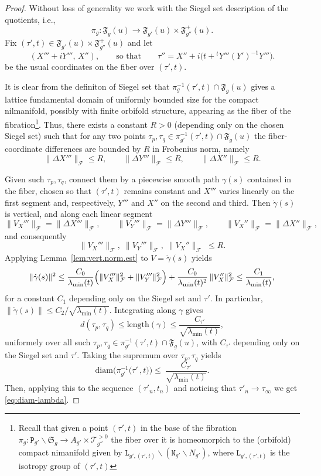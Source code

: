 \documentclass[10pt,a4paper]{amsart}
\newcommand{\cT}[1]{\mathscr{T}_{#1}^{\scriptscriptstyle{>0}}}
\newcommand{\diam}{\mathrm{diam}}
\newcommand{\fF}{\mathfrak{F}}
\newcommand{\fS}{\mathfrak{S}}
\newcommand{\tL}{\mathtt{L}}
\newcommand{\tN}{\mathtt{N}}
\newcommand{\tP}{\mathtt{P}}
\begin{document}
\begin{proof}
Without loss of generality we work with the Siegel set description of the quotients, i.e.,
\[
    \pi_{g}:\fF_g(u)\longrightarrow\fF_{g'}(u)\times\fF^{+}_{g''}(u).
\]
Fix $(\tau',t)\in \fF_{g'}(u)\times\fF^{+}_{g''}(u)$ and let 
\[
    (X'''+iY''',\,X''),
    \qquad\text{so that}\qquad
    \tau''=X'' + i\bigl(t+{}^tY'''(Y')^{-1}Y'''\bigr).
\]
be the usual coordinates on the fiber over $(\tau',t)$. 

It is clear from the definiton of Siegel set that $\pi^{-1}_{g}(\tau',t)\cap \fF_g(u)$  gives a lattice fundamental domain of uniformly bounded size for the compact nilmanifold, possibly with finite orbifold structure, appearing as the fiber of the fibration\footnote{Recall that given a point $(\tau',t)$ in the base of the fibration $\pi_g: \tP_{g'}\backslash \fS_g\to A_{g'}\times\cT{g''}$ the fiber over it is homeomorpich to the (orbifold) compact nimanifold given by $\tL_{g',(\tau',t)}\backslash(\tN_{g'}\backslash N_{g'})$, where $\tL_{g',(\tau',t)}$ is the isotropy group of $(\tau',t)$}. Thus, there exists a constant $R>0$ (depending only on the chosen Siegel set) such that for any two points $\tau_p,\tau_q\in \pi_{g'}^{-1}(\tau',t)\cap\fF_g(u)$ the fiber-coordinate differences are bounded by $R$ in Frobenius norm, namely
\begin{equation}\label{eq:bounded-increments}
\|\Delta X'''\|_{\mathcal {F}}\le R,\qquad
\|\Delta Y'''\|_{\mathcal {F}}\le R,\qquad
\|\Delta X''\|_{\mathcal {F}}\le R.
\end{equation}

Given such $\tau_p,\tau_q$, connect them by a piecewise smooth path $\gamma(s)$ contained in the fiber, chosen so that $(\tau',t)$ remains constant and $X'''$ varies linearly on the first segment and, respectively, $Y'''$ and $X''$ on the second and third. Then $\dot\gamma(s)$ is vertical, and along each linear segment
\[
\|V_X'''\|_{\mathcal{F}}=\|\Delta X'''\|_{\mathcal{F}},\qquad
\|V_Y'''\|_{\mathcal{F}}=\|\Delta Y'''\|_{\mathcal{F}},\qquad
\|V_X''\|_{\mathcal{F}}=\|\Delta X''\|_{\mathcal{F}},
\]
and consequently
\[
\|V_X'''\|_{\mathcal{F}},\;\|V_Y'''\|_{\mathcal{F}},\;\|V_X''\|_{\mathcal{F}}\;\le R.
\]
Applying Lemma~\ref{lem:vert.norm.est} to $V=\dot\gamma(s)$ yields
\[
\|\dot\gamma(s)\|^2
\le
\frac{C_0}{\lambda_{\min}(t)}\Bigl(\|V_X'''\|_{\mathcal{F}}^2+\|V_Y'''\|_{\mathcal{F}}^2\Bigr)
+
\frac{C_0}{\lambda_{\min}(t)^2}\,\|V_X''\|_{\mathcal{F}}^2
\le
\frac{C_1}{\lambda_{\min}(t)},
\]
for a constant $C_1$ depending only on the Siegel set and $\tau'$. In particular, $\|\dot\gamma(s)\|\le C_2/\sqrt{\lambda_{\min}(t)}$. Integrating along $\gamma$ gives
\[
d(\tau_p,\tau_q)\le \mathrm{length}(\gamma)
\le \frac{C_{\tau'}}{\sqrt{\lambda_{\min}(t)}},
\]
uniformely over all such $\tau_p,\tau_q\in \pi_{g'}^{-1}(\tau',t)\cap \fF_g(u)$, with $C_{\tau'}$ depending only on the Siegel set and $\tau'$. Taking the supremum over $\tau_p,\tau_q$ yields 
\[
\diam\big(\pi_{g'}^{-1}\big(\tau'\,,t\big)\big) \le\ \frac{C_{\tau'}}{\sqrt{\lambda_{\min}(t)}}.
\]
Then, applying this to the sequence $(\tau'_n,t_n)$ and noticing that $\tau'_n\to \tau_\infty$ we get \eqref{eq:diam-lambda}.


\end{proof}
\end{document}
